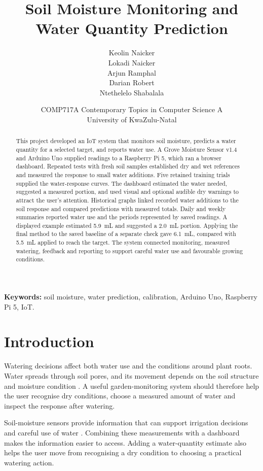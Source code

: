 \documentclass[11pt,a4paper]{article}
\title{Soil Moisture Monitoring and Water Quantity Prediction}
\author{Keolin Naicker\\
Lokadi Naicker\\
Arjun Ramphal\\
Darian Robert\\
Ntethelelo Shabalala}
\date{COMP717A Contemporary Topics in Computer Science A\\
University of KwaZulu-Natal}
\begin{document}
\maketitle

\begin{abstract}
This project developed an IoT system that monitors soil moisture, predicts a water quantity for a selected target, and reports water use. A Grove Moisture Sensor v1.4 and Arduino Uno supplied readings to a Raspberry Pi 5, which ran a browser dashboard. Repeated tests with fresh soil samples established dry and wet references and measured the response to small water additions. Five retained training trials supplied the water-response curves. The dashboard estimated the water needed, suggested a measured portion, and used visual and optional audible dry warnings to attract the user's attention. Historical graphs linked recorded water additions to the soil response and compared predictions with measured totals. Daily and weekly summaries reported water use and the periods represented by saved readings. A displayed example estimated 5.9~mL and suggested a 2.0~mL portion. Applying the final method to the saved baseline of a separate check gave 6.1~mL, compared with 5.5~mL applied to reach the target. The system connected monitoring, measured watering, feedback and reporting to support careful water use and favourable growing conditions.
\end{abstract}

\noindent\textbf{Keywords:} soil moisture, water prediction, calibration, Arduino Uno, Raspberry Pi 5, IoT.

\section{Introduction}

Watering decisions affect both water use and the conditions around plant roots. Water spreads through soil pores, and its movement depends on the soil structure and moisture condition \cite{ref14}. A useful garden-monitoring system should therefore help the user recognise dry conditions, choose a measured amount of water and inspect the response after watering.

Soil-moisture sensors provide information that can support irrigation decisions and careful use of water \cite{ref4}. Combining these measurements with a dashboard makes the information easier to access. Adding a water-quantity estimate also helps the user move from recognising a dry condition to choosing a practical watering action.
\end{document}
